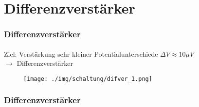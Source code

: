 \section{Differenzverstärker} %
\label{sec:Differenzverstärker}
\begin{frame}
    \frametitle{Differenzverstärker}
    \framesubtitle{}
    \begin{block}{Ziel:}
        Verstärkung sehr kleiner Potentialunterschiede $\Delta V \approx 10\mu
        V$ \\ $\rightarrow$ Differenzverstärker
    \end{block}
    \pause
    \begin{figure}[H]
    \begin{center}
            \texttt{[image: ./img/schaltung/difver\_1.png]}
    \end{center}
    \end{figure}
\end{frame}
\begin{frame}
    \frametitle{Differenzverstärker}
    \framesubtitle{}
    
\end{frame}

